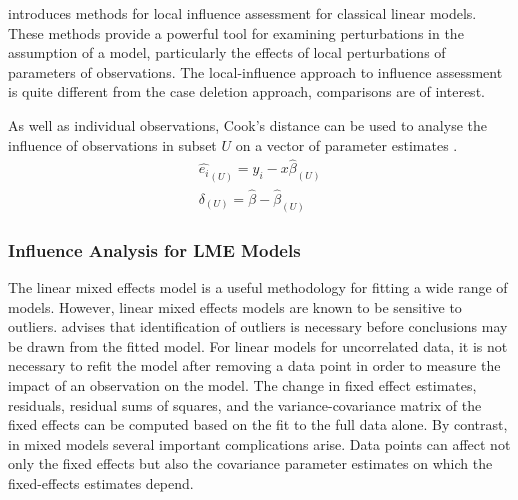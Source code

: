 \documentclass[12pt, a4paper]{report}
\theoremstyle{plain}
\theoremstyle{definition}
\theoremstyle{remark}
\begin{document}
 \citet{cook86} introduces methods for local influence assessment for classical linear models. These methods provide a powerful tool for examining perturbations in the assumption of a model, particularly the effects of local perturbations of parameters of observations. The local-influence approach to influence assessment is quite different from the case deletion approach, comparisons are of interest.



	
	
	

	
	As well as individual observations, Cook's distance can be used to analyse the influence of observations in subset $U$ on a vector of parameter estimates \citep{cook77}.
	\begin{eqnarray}
	\hat{e_{i}}_{(U)} = y_{i} - x\hat{\beta}_{(U)}\\
	\delta_{(U)} = \hat{\beta} - \hat{\beta}_{(U)}
	\end{eqnarray}
	
	\subsubsection{Influence Analysis for LME Models} %
	The linear mixed effects model is a useful methodology for fitting a wide range of models. However, linear mixed effects models are known to be sensitive to outliers. \citet{Christensen} advises that identification of outliers is necessary before conclusions may be drawn from the fitted model. For linear models for uncorrelated data, it is not necessary to refit the model after removing a data point in order to measure the impact of an observation on the model. The change in fixed effect estimates, residuals, residual sums of squares, and the variance-covariance matrix of the fixed effects can be computed based on the fit to the full data alone. By contrast, in mixed models several important complications arise. Data points can affect not only the fixed effects but also the covariance parameter estimates on which the fixed-effects estimates depend.
	
	
\end{document}
